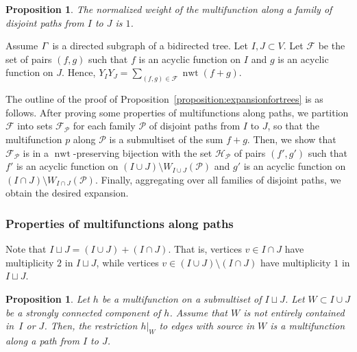 \documentclass[11pt]{article}
\newtheorem{prop}[theo]{Proposition}
\theoremstyle{definition}
\numberwithin{equation}{section}
\newcommand{\vertices}{V}
\DeclareMathOperator{\normalizedweight}{nwt}
\begin{document}
\begin{prop} \label{proposition:alongpath:normalizedweight}
    The normalized weight of the multifunction along a family of disjoint paths from \(I\) to \(J\) is \(1\).
\end{prop}


Assume \(\varGamma\) is a directed subgraph of a bidirected tree.
Let \(I, J \subset \vertices\).
Let \(\mathcal{F}\) be the set of pairs \((f, g)\) such that \(f\) is an acyclic function on \(I\) and \(g\) is an acyclic function on \(J\).
Hence, \(Y_I Y_J = \sum_{(f, g) \in \mathcal{F}} \normalizedweight(f + g)\).

The outline of the proof of Proposition~\ref{proposition:expansionfortrees} is as follows.
After proving some properties of multifunctions along paths,
we partition \(\mathcal{F}\) into sets \(\mathcal{F}_{\mathcal{P}}\) for each family \(\mathcal{P}\) of disjoint paths from \(I\) to \(J\),
so that the multifunction \(p\) along \(\mathcal{P}\) is a submultiset of the sum \(f + g\).
Then, we show that \(\mathcal{F}_{\mathcal{P}}\) is in a \(\normalizedweight\)-preserving bijection with the set \(\mathcal{H}_{\mathcal{P}}\) of pairs \((f', g')\) such that \(f'\) is an acyclic function on \((I \cup J) \setminus W_{I \cup J}(\mathcal{P})\) and \(g'\) is an acyclic function on \((I \cap J) \setminus W_{I \cap J}(\mathcal{P})\).
Finally, aggregating over all families of disjoint paths, we obtain the desired expansion.


\subsubsection{Properties of multifunctions along paths}

Note that \(I \sqcup J = (I \cup J) + (I \cap J)\).
That is, vertices \(v \in I \cap J\) have multiplicity \(2\) in \(I \sqcup J\),
while vertices \(v \in (I \cup J) \setminus (I \cap J)\) have multiplicity \(1\) in \(I \sqcup J\).

\begin{prop} \label{proposition:restriction-strongly-connected}
    Let \(h\) be a multifunction on a submultiset of \(I \sqcup J\).
    Let \(W \subset I \cup J\) be a strongly connected component of \(h\).
    Assume that \(W\) is not entirely contained in~\(I\) or \(J\).
    Then, the restriction \(h|_W\) to edges with source in \(W\)
     is a multifunction along a path from \(I\) to \(J\).
\end{prop}
\end{document}
